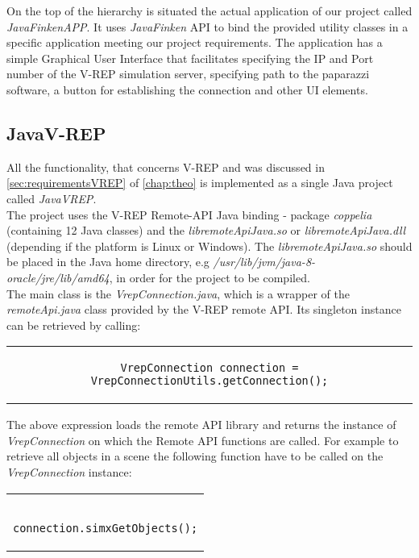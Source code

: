 On the top of the hierarchy is situated the actual application of our project called \textit{JavaFinkenAPP}. It uses \textit{JavaFinken} API to bind the provided utility classes in a specific application meeting our project requirements. The application has a simple Graphical User Interface that facilitates specifying the IP and Port number of the V-REP simulation server, specifying path to the paparazzi software, a button for establishing the connection and other UI elements.




\subsection{JavaV-REP}
\label{sec:vrepImplementation}

All the functionality, that concerns V-REP and was discussed in \ref{sec:requirementsVREP} of \ref{chap:theo} is implemented as a single Java project called \textit{JavaVREP}.\\
 The project uses the V-REP Remote-API Java binding - package \textit{coppelia} (containing 12 Java classes) and the \textit{libremoteApiJava.so} or \textit{libremoteApiJava.dll} (depending if the platform is Linux or Windows). The \textit{libremoteApiJava.so} should be placed in the Java home directory, e.g \textit{/usr/lib/jvm/java-8-oracle/jre/lib/amd64}, in order for the project to be compiled.\\
The main class is the \textit{VrepConnection.java}, which is a wrapper of the \textit{remoteApi.java} class provided by the V-REP remote API. Its singleton instance can be retrieved by calling:

\begin{center}
\begin{tabular}{c}
\begin{lstlisting}[basicstyle=\small]
VrepConnection connection = VrepConnectionUtils.getConnection();
\end{lstlisting}
\end{tabular}
\end{center}

The above expression loads the remote API library and returns the instance of \textit{VrepConnection} on which the Remote API functions are called. For example to retrieve all objects in a scene the following function have to be called on the \textit{VrepConnection} instance:

\begin{center}
\begin{tabular}{c}
\begin{lstlisting}[basicstyle=\small]

connection.simxGetObjects();

\end{lstlisting}
\end{tabular}
\end{center}

